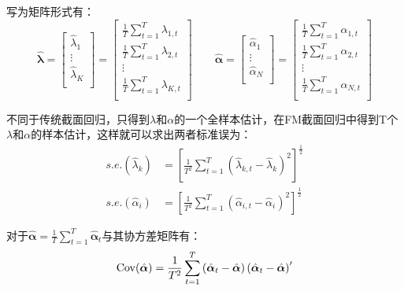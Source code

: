 \documentclass[11pt]{article}
\begin{document}
写为矩阵形式有：
\begin{equation*}
    \hat{\bm{\lambda}} 
    = \begin{bmatrix} \hat{\lambda}_1 \\ \vdots \\ \hat{\lambda}_K \\ \end{bmatrix}
    = \begin{bmatrix} \frac{1}{T} \sum_{t=1}^{T} \lambda_{1,t} \\ \frac{1}{T} \sum_{t=1}^{T} \lambda_{2,t} \\ \vdots \\ \frac{1}{T} \sum_{t=1}^{T} \lambda_{K,t} \\ \end{bmatrix} 
    \qquad
    \hat{\bm{\alpha}} 
    = \begin{bmatrix} \hat{\alpha}_1 \\ \vdots \\ \hat{\alpha}_N \\ \end{bmatrix}
    = \begin{bmatrix} \frac{1}{T} \sum_{t=1}^{T} \alpha_{1,t} \\ \frac{1}{T} \sum_{t=1}^{T} \alpha_{2,t} \\ \vdots \\ \frac{1}{T} \sum_{t=1}^{T} \alpha_{N,t} \\ \end{bmatrix}
\end{equation*}

不同于传统截面回归，只得到$\lambda$和$\alpha$的一个全样本估计，在FM截面回归中得到T个$\lambda$和$\alpha$的样本估计，这样就可以求出两者标准误为：
\begin{align*}
    s.e.(\hat{\lambda}_k) &= \left[ \frac{1}{T^2} \sum_{t=1}^{T} (\hat{\lambda}_{k,t} - \hat{\lambda}_k)^2 \right]^{\frac{1}{2}} \\
    s.e.(\hat{\alpha}_i) &= \left[ \frac{1}{T^2} \sum_{t=1}^{T} (\hat{\alpha}_{i,t} - \hat{\alpha}_i)^2 \right]^{\frac{1}{2}}
\end{align*}

对于$\hat{\bm{\alpha}} = \frac{1}{T} \sum_{t=1}^{T} \hat{\bm{\alpha}}_{t}$与其协方差矩阵有：
\begin{equation*}
    \operatorname{Cov}(\hat{\bm{\alpha}})
    = \frac{1}{T^2} \sum_{t=1}^{T} \left(\hat{\bm{\alpha}}_t - \hat{\bm{\alpha}}\right) \left(\hat{\bm{\alpha}}_t - \hat{\bm{\alpha}}\right)'
\end{equation*}
\end{document}
